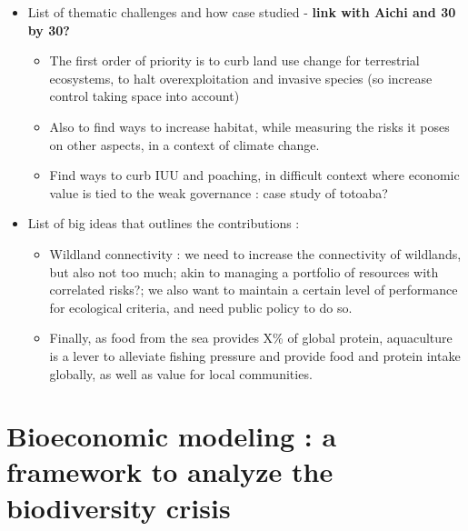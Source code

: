 
\begin{itemize}
\item List of thematic challenges and how case studied - \textbf{link with Aichi and 30 by 30?}
\begin{itemize}
\item The first order of priority is to curb land use change for terrestrial ecosystems, to halt overexploitation and invasive species (so increase control taking space into account)
\item Also to find ways to increase habitat, while measuring the risks it poses on other aspects, in a context of climate change. 
\item Find ways to curb IUU and poaching, in difficult context where economic value is tied to the weak governance : case study of totoaba? 
\end{itemize}
\item List of big ideas that outlines the contributions : 
\begin{itemize}
\item Wildland connectivity : we need to increase the connectivity of wildlands, but also not too much; akin to managing a portfolio of resources with correlated risks?; we also want to maintain a certain level of performance for ecological criteria, and need public policy to do so.
\item Finally, as food from the sea provides X\% of global protein, aquaculture is a lever to alleviate fishing pressure and provide food and protein intake globally, as well as value for local communities. 
\end{itemize}
\end{itemize}

\section*{Bioeconomic modeling : a framework to analyze the biodiversity crisis}


